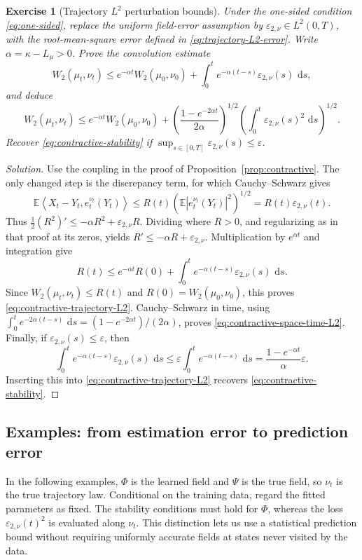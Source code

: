 \documentclass[11pt]{amsart}
\numberwithin{equation}{section}
\theoremstyle{plain}
\newtheorem{exercise}[theorem]{Exercise}
\newcommand{\E}{\mathbb{E}}
\newcommand{\dd}{\,\mathrm{d}}
\newcommand{\abs}[1]{\left\lvert#1\right\rvert}
\newcommand{\ip}[2]{\left\langle#1,#2\right\rangle}
\begin{document}
\begin{exercise}[Trajectory $L^2$ perturbation bounds]\label{ex:contractive-trajectory-L2}
Under the one-sided condition \eqref{eq:one-sided}, replace the uniform
field-error assumption by
$\varepsilon_{2,\nu}\in L^2(0,T)$, with the root-mean-square error defined in
\eqref{eq:trajectory-L2-error}.  Write $\alpha=\kappa-L_\mu>0$.
Prove the convolution estimate
\begin{equation}\label{eq:contractive-trajectory-L2}
 W_2(\mu_t,\nu_t)
 \leq e^{-\alpha t}W_2(\mu_0,\nu_0)
       +\int_0^t e^{-\alpha(t-s)}\varepsilon_{2,\nu}(s)\,\dd s,
\end{equation}
and deduce
\begin{equation}\label{eq:contractive-space-time-L2}
 W_2(\mu_t,\nu_t)
 \leq e^{-\alpha t}W_2(\mu_0,\nu_0)
 +\left(\frac{1-e^{-2\alpha t}}{2\alpha}\right)^{1/2}
   \left(\int_0^t\varepsilon_{2,\nu}(s)^2\,\dd s\right)^{1/2}.
\end{equation} 
Recover \eqref{eq:contractive-stability} if
$\sup_{s\in[0,T]}\varepsilon_{2,\nu}(s)\leq\varepsilon$. 
\end{exercise}
\begin{proof}[Solution]
Use the coupling in the proof of Proposition~\ref{prop:contractive}.
The only changed step is the discrepancy term, for which Cauchy--Schwarz gives
\[
 \E\ip{X_t-Y_t}{e_t^{\nu_t}(Y_t)}
 \leq R(t)\left(\E\abs{e_t^{\nu_t}(Y_t)}^2\right)^{1/2}
 =R(t)\varepsilon_{2,\nu}(t).
\]
Thus $\frac12(R^2)'\leq-\alpha R^2+\varepsilon_{2,\nu}R$.
Dividing where $R>0$, and regularizing as in that proof at its zeros, yields
$R'\leq-\alpha R+\varepsilon_{2,\nu}$.  Multiplication by $e^{\alpha t}$ and
integration give
\[
 R(t)\leq e^{-\alpha t}R(0)
       +\int_0^t e^{-\alpha(t-s)}\varepsilon_{2,\nu}(s)\,\dd s.
\]
Since $W_2(\mu_t,\nu_t)\leq R(t)$ and $R(0)=W_2(\mu_0,\nu_0)$, this proves
\eqref{eq:contractive-trajectory-L2}.  Cauchy--Schwarz in time, using
$\int_0^t e^{-2\alpha(t-s)}\,\dd s=(1-e^{-2\alpha t})/(2\alpha)$, proves
\eqref{eq:contractive-space-time-L2}. 
Finally, if $\varepsilon_{2,\nu}(s)\leq\varepsilon$, then
\[
 \int_0^t e^{-\alpha(t-s)}\varepsilon_{2,\nu}(s)\,\dd s
 \leq\varepsilon\int_0^t e^{-\alpha(t-s)}\,\dd s
 =\frac{1-e^{-\alpha t}}{\alpha}\varepsilon.
\]
Inserting this into \eqref{eq:contractive-trajectory-L2} recovers
\eqref{eq:contractive-stability}.
\end{proof}



\subsection{Examples: from estimation error to prediction error}
In the following examples, $\Phi$ is the learned field and $\Psi$ is the
true field, so $\nu_t$ is the true trajectory law.  Conditional on the training
data, regard the fitted parameters as fixed.  The stability conditions must
hold for $\Phi$, whereas the loss
$\varepsilon_{2,\nu}(t)^2$ is evaluated along $\nu_t$.
This distinction lets us use a statistical prediction bound without requiring
uniformly accurate fields at states never visited by the data.
\end{document}

